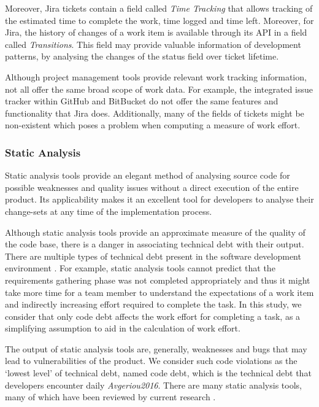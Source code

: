 \documentclass{mpaper}
\begin{document}
Moreover, Jira tickets contain a field called \emph{Time Tracking} that
allows tracking of the estimated time to complete the work, time logged and time
left. Moreover, for Jira, the history of changes of a work item is available
through its API in a field called \emph{Transitions}. This field may provide
valuable information of development patterns, by analysing the changes of the
status field over ticket lifetime. 

Although project management tools provide relevant work tracking information,
not all offer the same broad scope of work data. For example, the integrated
issue tracker within GitHub and BitBucket do not offer the same features and
functionality that Jira does. Additionally, many of the fields of tickets might
be non-existent which poses a problem when computing a measure of work effort.

\subsubsection*{Static Analysis}
\label{static-analysis}

Static analysis tools provide an elegant method of analysing source code for
possible weaknesses and quality issues without a direct execution of the entire
product. Its applicability makes it an excellent tool for developers to analyse
their change-sets at any time of the implementation process.

Although static analysis tools provide an approximate measure of the quality of
the code base, there is a danger in associating technical debt with their
output. There are multiple types of technical debt present in the software
development environment \cite{Li2015}. For example, static analysis tools cannot
predict that the requirements gathering phase was not completed appropriately
and thus it might take more time for a team member to understand the
expectations of a work item and indirectly increasing effort required to
complete the task. In this study, we consider that only code debt affects the
work effort for completing a task, as a simplifying assumption to aid in the
calculation of work effort. 

The output of static analysis tools are, generally, weaknesses and bugs that may
lead to vulnerabilities of the product. We consider such code violations as the
`lowest level' of technical debt, named code debt, which is the technical debt
that developers encounter daily \emph{Avgeriou2016}. There are many static
analysis tools, many of which have been reviewed by current research
\cite{Fontana2011}. 
\end{document}
